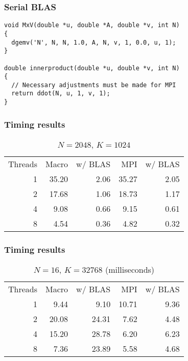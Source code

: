 \begin{frame}[fragile]
  \frametitle{Serial BLAS}
\begin{lstlisting}[style=c, basicstyle=\ttfamily\footnotesize]
void MxV(double *u, double *A, double *v, int N)
{
  dgemv('N', N, N, 1.0, A, N, v, 1, 0.0, u, 1);
}

double innerproduct(double *u, double *v, int N)
{
  // Necessary adjustments must be made for MPI
  return ddot(N, u, 1, v, 1);
}
\end{lstlisting}
\end{frame}

\begin{frame}
  \frametitle{Timing results}
  \begin{center}
    \begin{table}
      \caption{$N=2048$, $K=1024$}
      \bgroup{}
      \begin{tabular}{rrrrr}
        \hline
        Threads & Macro & w/ BLAS & MPI & w/ BLAS \\
        \hhline{=====}
        1 & 35.20 & 2.06 & 35.27 & 2.05 \\
        2 & 17.68 & 1.06 & 18.73 & 1.17 \\
        4 &  9.08 & 0.66 &  9.15 & 0.61 \\
        8 &  4.54 & 0.36 &  4.82 & 0.32 \\
        \hline
      \end{tabular}
      \egroup
    \end{table}
  \end{center}
\end{frame}

\begin{frame}
  \frametitle{Timing results}
  \begin{center}
    \begin{table}
      \caption{$N=16$, $K=32768$ (milliseconds)}
      \bgroup{}
      \begin{tabular}{rrrrr}
        \hline
        Threads & Macro & w/ BLAS & MPI & w/ BLAS \\
        \hhline{=====}
        1 &  9.44 &  9.10 & 10.71 & 9.36 \\
        2 & 20.08 & 24.31 &  7.62 & 4.48 \\
        4 & 15.20 & 28.78 &  6.20 & 6.23 \\
        8 &  7.36 & 23.89 &  5.58 & 4.68 \\
        \hline
      \end{tabular}
      \egroup
    \end{table}
  \end{center}
\end{frame}


